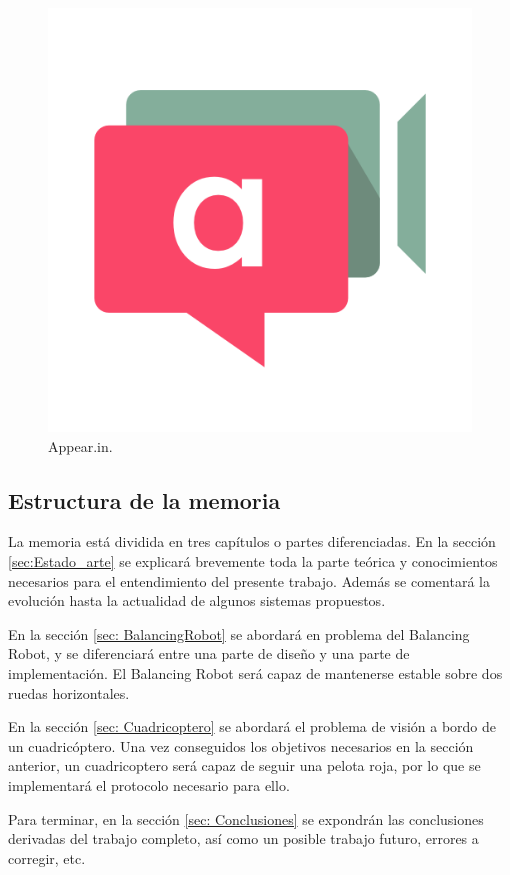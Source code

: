 \begin{figure}[H]
	\center
	\includegraphics[trim = 0mm 0mm 0mm 0mm, clip,scale=0.3]{imagenes/Introduction/appear}
	\caption{Appear.in.}
	\label{fig:appear}
\end{figure}

\subsection{Estructura de la memoria}

La memoria está dividida en tres capítulos o partes diferenciadas. \newline
En la sección \ref{sec:Estado_arte} se explicará brevemente toda la parte teórica y conocimientos necesarios para el entendimiento del presente trabajo. Además se comentará la evolución hasta la actualidad de algunos sistemas propuestos.\newline

En la sección \ref{sec: BalancingRobot} se abordará en problema del Balancing Robot, y se diferenciará entre una parte de diseño y una parte de implementación. El Balancing Robot será capaz de mantenerse estable sobre dos ruedas horizontales.\newline

En la sección \ref{sec: Cuadricoptero} se abordará el problema de visión a bordo de un cuadricóptero. 
Una vez conseguidos los objetivos necesarios en la sección anterior, un cuadricoptero será capaz de seguir una pelota roja, por lo que se implementará el protocolo necesario para ello. \newline

Para terminar, en la sección \ref{sec: Conclusiones} se expondrán las conclusiones derivadas del trabajo completo, así como un posible trabajo futuro, errores a corregir, etc.   
